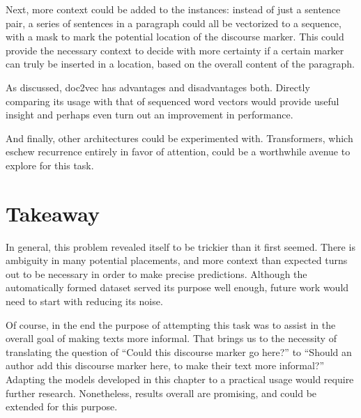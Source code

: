 Next, more context could be added to the instances: instead of just a sentence pair, a series of sentences in a paragraph could all be vectorized to a sequence, with a mask to mark the potential location of the discourse marker. This could provide the necessary context to decide with more certainty if a certain marker can truly be inserted in a location, based on the overall content of the paragraph.

As discussed, doc2vec has advantages and disadvantages both. Directly comparing its usage with that of sequenced word vectors would provide useful insight and perhaps even turn out an improvement in performance.

And finally, other architectures could be experimented with. Transformers, which eschew recurrence entirely in favor of attention, could be a worthwhile avenue to explore for this task.

\section{Takeaway}

In general, this problem revealed itself to be trickier than it first seemed. There is ambiguity in many potential placements, and more context than expected turns out to be necessary in order to make precise predictions. Although the automatically formed dataset served its purpose well enough, future work would need to start with reducing its noise. 

Of course, in the end the purpose of attempting this task was to assist in the overall goal of making texts more informal. That brings us to the necessity of translating the question of ``Could this discourse marker go here?'' to ``Should an author add this discourse marker here, to make their text more informal?'' Adapting the models developed in this chapter to a practical usage would require further research. Nonetheless, results overall are promising, and could be extended for this purpose.
